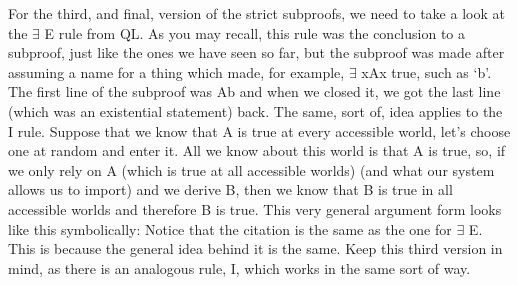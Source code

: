 For the third, and final, version of the strict subproofs, we need to take a look at the $\exists$ E rule from QL. As you may recall, this rule was the conclusion to a subproof, just like the ones we have seen so far, but the subproof was made after assuming a name for a thing which made, for example, $\exists$ xAx true, such as `b'. The first line of the subproof was Ab and when we closed it, we got the last line (which was an existential statement) back. The same, sort of, idea applies to the \ebox I rule. Suppose that we know that A is true at every accessible world, let's choose one at random and enter it. All we know about this world is that A is true, so, if we only rely on A (which is true at all accessible worlds) (and what our system allows us to import) and we derive B, then we know that B is true in all accessible worlds and therefore \ebox B is true. This very general argument form looks like this symbolically:
Notice that the citation is the same as the one for $\exists$ E. This is because the general idea behind it is the same. Keep this third version in mind, as there is an analogous rule, \ediamond I, which works in the same sort of way.
